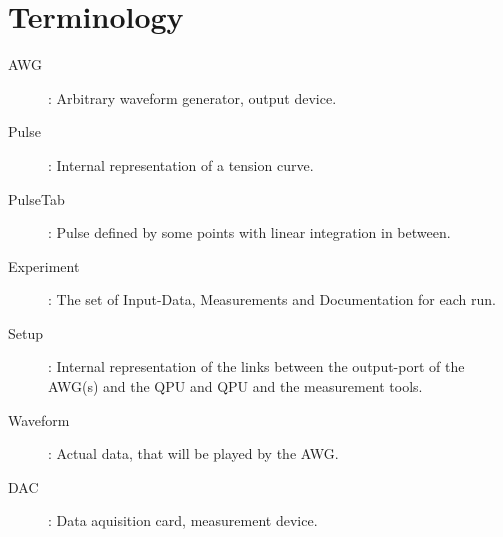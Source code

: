 \documentclass[a4paper,12pt]{article}
\begin{document}
\section{Terminology}
 \begin{description}
  \item[AWG]: Arbitrary waveform generator, output device.
  \item[Pulse]: Internal representation of a tension curve.
  \item[PulseTab]: Pulse defined by some points with linear integration in between.
  \item[Experiment]: The set of Input-Data, Measurements and Documentation for each run.
  \item[Setup]: Internal representation of the links between the output-port of the AWG(s) and the QPU and QPU and the measurement tools.
  \item[Waveform]: Actual data, that will be played by the AWG. 
  \item[DAC]: Data aquisition card, measurement device.
 \end{description}
\end{document}
